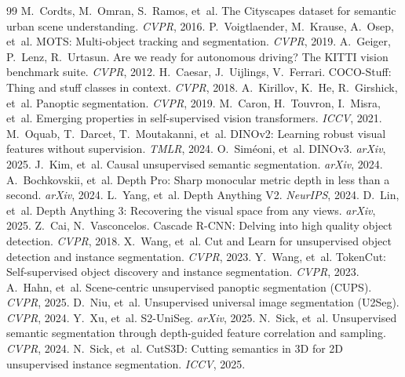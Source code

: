 \documentclass[10pt,twocolumn,letterpaper]{article}
\begin{document}
\begin{thebibliography}{99}
 M.~Cordts, M.~Omran, S.~Ramos, et~al. The Cityscapes dataset for semantic urban scene understanding. \emph{CVPR}, 2016.
 P.~Voigtlaender, M.~Krause, A.~Osep, et~al. MOTS: Multi-object tracking and segmentation. \emph{CVPR}, 2019.
 A.~Geiger, P.~Lenz, R.~Urtasun. Are we ready for autonomous driving? The KITTI vision benchmark suite. \emph{CVPR}, 2012.
 H.~Caesar, J.~Uijlings, V.~Ferrari. COCO-Stuff: Thing and stuff classes in context. \emph{CVPR}, 2018.
 A.~Kirillov, K.~He, R.~Girshick, et~al. Panoptic segmentation. \emph{CVPR}, 2019.
 M.~Caron, H.~Touvron, I.~Misra, et~al. Emerging properties in self-supervised vision transformers. \emph{ICCV}, 2021.
 M.~Oquab, T.~Darcet, T.~Moutakanni, et~al. DINOv2: Learning robust visual features without supervision. \emph{TMLR}, 2024.
 O.~Sim\'eoni, et~al. DINOv3. \emph{arXiv}, 2025.
 J.~Kim, et~al. Causal unsupervised semantic segmentation. \emph{arXiv}, 2024.
 A.~Bochkovskii, et~al. Depth Pro: Sharp monocular metric depth in less than a second. \emph{arXiv}, 2024.
 L.~Yang, et~al. Depth Anything V2. \emph{NeurIPS}, 2024.
 D.~Lin, et~al. Depth Anything 3: Recovering the visual space from any views. \emph{arXiv}, 2025.
 Z.~Cai, N.~Vasconcelos. Cascade R-CNN: Delving into high quality object detection. \emph{CVPR}, 2018.
 X.~Wang, et~al. Cut and Learn for unsupervised object detection and instance segmentation. \emph{CVPR}, 2023.
 Y.~Wang, et~al. TokenCut: Self-supervised object discovery and instance segmentation. \emph{CVPR}, 2023.
 A.~Hahn, et~al. Scene-centric unsupervised panoptic segmentation (CUPS). \emph{CVPR}, 2025.
 D.~Niu, et~al. Unsupervised universal image segmentation (U2Seg). \emph{CVPR}, 2024.
 Y.~Xu, et~al. S2-UniSeg. \emph{arXiv}, 2025.
 N.~Sick, et~al. Unsupervised semantic segmentation through depth-guided feature correlation and sampling. \emph{CVPR}, 2024.
 N.~Sick, et~al. CutS3D: Cutting semantics in 3D for 2D unsupervised instance segmentation. \emph{ICCV}, 2025.

\end{thebibliography}
\end{document}
